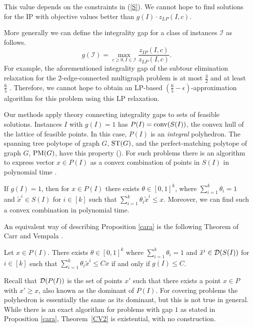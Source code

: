 This value depends on the constraints in (\ref{S}).  We cannot hope to find solutions for the IP with objective values better than $g(I)\cdot z_{LP}(I,c)$. 

More generally we can define the integrality gap for a class of instances $\mathcal{I}$ as follows.%
\begin{equation}\label{gapproblem}
g(\mathcal{I}) = \max_{c\geq 0 , I\in\mathcal{I}}\frac{z_{IP}(I,c)}{z_{LP}(I,c)}.
\end{equation}
For example, the aforementioned integrality gap of the subtour elimination relaxation for the 2-edge-connected multigraph problem is at most $\frac{3}{2}$ \cite{wolsey} and at least $\frac{6}{5}$ \cite{alexander2006integrality}. Therefore, we cannot hope to obtain an LP-based $(\frac{6}{5}-\epsilon)$-approximation algorithm for this problem using this LP relaxation.


Our methods apply theory connecting integrality gaps to sets of feasible solutions. Instances $I$ with  $g(I)=1$ has $P(I)=\operatorname{conv}(S(I))$, the convex hull of the lattice of feasible points. In this case, $P(I)$ is an \textit{integral} polyhedron. The spanning tree polytope of graph $G$, $\operatorname{ST}(G)$, and the perfect-matching polytope of graph $G$, $\operatorname{{{PM}}}(G)$, have this property (\cite{Edmonds2003,edmondsPM}). For such problems there is an algorithm to express vector $x\in P(I)$ as a convex combination of points in $S(I)$ in polynomial time \cite{cons-cara}.
\begin{proposition}\label{cara}
	If $g(I)=1$, then for $x\in P(I)$ there exists $\theta \in [0,1]^k$, where $\sum_{i=1}^{k}\theta_i =1$ and $\tilde{x}^i\in S(I)$ for $i\in [k]$ such that $\sum_{i=1}^{k}\theta_i \tilde{x}^i\leq x$. Moreover, we can find such a convex combination in polynomial time.
\end{proposition}

An equivalent way of describing Proposition \ref{cara} is the following Theorem of Carr and Vempala \cite{Carr2004}.

\begin{thm} \label{CV2}
	Let $x\in P(I)$. There exists $\theta \in [0,1]^k$ where $\sum_{i=1}^{k}\theta_i =1$ and $\tilde{x}^i\in \operatorname{\mathcal{D}}(S(I))$ for $i\in [k]$ such that $\sum_{i=1}^{k}\theta_i \tilde{x}^i\leq Cx$ if and only if $g(I) \leq C$.
\end{thm}
Recall that $\operatorname{\mathcal{D}}(P(I))$ is the set of points $x'$ such that there exists a point $x\in P$ with $x'\geq x$, also known as the dominant of $P(I)$. For covering problems the polyhedron is essentially the same as its dominant, but this is not true in general. While there is an exact algorithm for problems with gap $1$ as stated in Proposition \ref{cara}, Theorem~\ref{CV2} is existential, with no construction.
\iffalse

